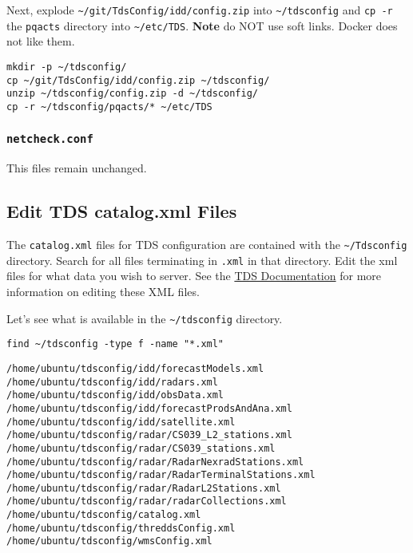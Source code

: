 \documentclass[11pt]{article}
\begin{document}
Next, explode \texttt{\textasciitilde{}/git/TdsConfig/idd/config.zip} into \texttt{\textasciitilde{}/tdsconfig} and \texttt{cp -r} the \texttt{pqacts} directory into \texttt{\textasciitilde{}/etc/TDS}. \textbf{Note} do NOT use soft links. Docker does not like them.

\begin{verbatim}
mkdir -p ~/tdsconfig/
cp ~/git/TdsConfig/idd/config.zip ~/tdsconfig/
unzip ~/tdsconfig/config.zip -d ~/tdsconfig/
cp -r ~/tdsconfig/pqacts/* ~/etc/TDS
\end{verbatim}

\subsubsection*{\texttt{netcheck.conf}}
\label{sec:orgheadline8}

This files remain unchanged.

\subsection*{Edit TDS catalog.xml Files}
\label{sec:orgheadline10}

The \texttt{catalog.xml} files for TDS configuration are contained with the \texttt{\textasciitilde{}/Tdsconfig} directory. Search for all files terminating in \texttt{.xml} in that directory. Edit the xml files for what data you wish to server. See the \href{//Www.Unidata.Ucar.Edu/Software/Thredds/Current/Tds/Catalog/Index.Html}{TDS Documentation} for more information on editing these XML files.

Let's see what is available in the \texttt{\textasciitilde{}/tdsconfig} directory.

\begin{verbatim}
find ~/tdsconfig -type f -name "*.xml"
\end{verbatim}

\begin{verbatim}
/home/ubuntu/tdsconfig/idd/forecastModels.xml
/home/ubuntu/tdsconfig/idd/radars.xml
/home/ubuntu/tdsconfig/idd/obsData.xml
/home/ubuntu/tdsconfig/idd/forecastProdsAndAna.xml
/home/ubuntu/tdsconfig/idd/satellite.xml
/home/ubuntu/tdsconfig/radar/CS039_L2_stations.xml
/home/ubuntu/tdsconfig/radar/CS039_stations.xml
/home/ubuntu/tdsconfig/radar/RadarNexradStations.xml
/home/ubuntu/tdsconfig/radar/RadarTerminalStations.xml
/home/ubuntu/tdsconfig/radar/RadarL2Stations.xml
/home/ubuntu/tdsconfig/radar/radarCollections.xml
/home/ubuntu/tdsconfig/catalog.xml
/home/ubuntu/tdsconfig/threddsConfig.xml
/home/ubuntu/tdsconfig/wmsConfig.xml
\end{verbatim}
\end{document}
